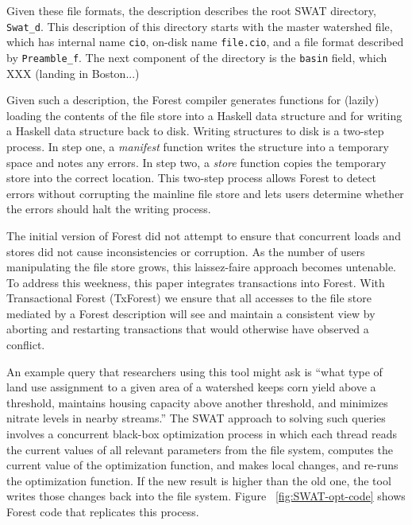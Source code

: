 Given these file formats, the description describes the root SWAT
directory, \texttt{Swat\_d}.  This description of this directory
starts with the master watershed file, which has internal name
\texttt{cio}, on-disk name \texttt{file.cio}, and a file format
described by \texttt{Preamble\_f}.  The next component of the
directory is the \texttt{basin} field, which XXX (landing in Boston...)




Given such a description, the Forest compiler generates functions for
(lazily) loading the contents of the file store into a Haskell data
structure and for writing a Haskell data structure back to disk.
Writing structures to disk is a two-step process.  In step one, a
\textit{manifest} function writes the structure into a temporary space
and notes any errors.  In step two, a \textit{store} function copies
the temporary store into the correct location.  This two-step process
allows Forest to detect errors without corrupting the mainline
file store and lets users determine whether the errors should halt the
writing process.

The initial version of Forest did not attempt to ensure that 
concurrent loads and stores did not cause inconsistencies or
corruption.  As the number of users manipulating the file store grows,
this laissez-faire approach becomes untenable.  To address this
weekness, this paper integrates transactions into Forest.  With
Transactional Forest (TxForest) we ensure that all accesses to the
file store mediated by a Forest description will see and maintain a
consistent view by aborting and restarting transactions that would
otherwise have observed a conflict.


An example query that researchers using this tool might ask is
``what type of land use assignment to a given area of a watershed
keeps corn yield above a threshold, maintains housing capacity above
another threshold, and minimizes nitrate levels in nearby streams.''
The SWAT approach to solving such queries involves a concurrent black-box
optimization process in which each thread reads the current values of
all relevant parameters from the file system, computes the current
value of the optimization function, and makes local changes, and re-runs
the optimization function. If the new result is higher than the old
one, the tool writes those changes back into the file system.  Figure
~\ref{fig:SWAT-opt-code} shows Forest code that replicates this process.

